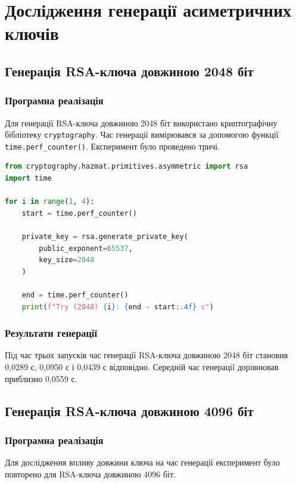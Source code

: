 \section{Дослідження генерації асиметричних ключів}

\subsection{Генерація RSA-ключа довжиною 2048 біт}

\subsubsection{Програмна реалізація}

Для генерації RSA-ключа довжиною 2048 біт використано криптографічну бібліотеку \texttt{cryptography}. Час генерації вимірювався за допомогою функції \texttt{time.perf\_counter()}. Експеримент було проведено тричі.

\begin{lstlisting}[language=Python]
from cryptography.hazmat.primitives.asymmetric import rsa
import time

for i in range(1, 4):
    start = time.perf_counter()

    private_key = rsa.generate_private_key(
        public_exponent=65537,
        key_size=2048
    )

    end = time.perf_counter()
    print(f"Try (2048) {i}: {end - start:.4f} c")
\end{lstlisting}

\subsubsection{Результати генерації}

Під час трьох запусків час генерації RSA-ключа довжиною 2048 біт становив 0,0289 с, 0,0950 с і 0,0439 с відповідно. Середній час генерації дорівнював приблизно 0,0559 с.

\subsection{Генерація RSA-ключа довжиною 4096 біт}

\subsubsection{Програмна реалізація}

Для дослідження впливу довжини ключа на час генерації експеримент було повторено для RSA-ключа довжиною 4096 біт.

